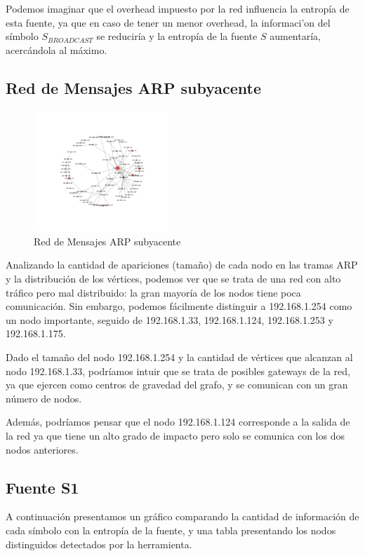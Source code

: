 Podemos imaginar que el overhead impuesto por la red influencia la entropía de esta fuente, ya que
en caso de tener un menor overhead, la informaci'on del s\'imbolo $S_{BROADCAST}$ se reducir\'ia y
la entrop\'ia de la fuente $S$ aumentar\'ia, acerc\'andola al m\'aximo.

\subsection{Red de Mensajes ARP subyacente}

\begin{figure}[H]
  \centering
    \includegraphics[width=0.45\textwidth]{agutter/gr3.png}
  \caption{Red de Mensajes ARP subyacente}
  \label{grafo-s1-agutter}
\end{figure}

Analizando la cantidad de apariciones (tama\~no) de cada nodo en las tramas ARP y la distribuci\'on de
los v\'ertices, podemos ver que se trata de una red con alto tr\'afico pero mal distribuido:
la gran mayor\'ia de los nodos tiene poca comunicaci\'on. Sin embargo, podemos f\'acilmente distinguir
a 192.168.1.254 como un nodo importante, seguido de 192.168.1.33, 192.168.1.124, 192.168.1.253 y
192.168.1.175.

Dado el tama\~no del nodo 192.168.1.254 y la cantidad de v\'ertices que alcanzan al nodo 192.168.1.33,
podr\'iamos intuir que se trata de posibles gateways de la red, ya que ejercen como centros de gravedad
del grafo, y se comunican con un gran n\'umero de nodos.

Adem\'as, podr\'iamos pensar que el nodo 192.168.1.124 corresponde a la salida de la red ya que tiene
un alto grado de impacto pero solo se comunica con los dos nodos anteriores.


\subsection{Fuente S1}

A continuaci\'on presentamos un gr\'afico comparando la cantidad de informaci\'on de cada s\'imbolo
con la entrop\'ia de la fuente, y una tabla presentando los nodos distinguidos detectados por la
herramienta.

